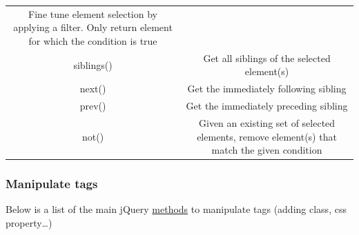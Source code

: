 \documentclass[]{book}
\begin{document}
\begin{longtable}[]{@{}cc@{}}
\begin{minipage}[t]{0.52\columnwidth}
Fine tune element selection by applying a filter. Only return element for which the condition is true\strut
\end{minipage}\tabularnewline
\begin{minipage}[t]{0.42\columnwidth}\centering
siblings()\strut
\end{minipage} & \begin{minipage}[t]{0.52\columnwidth}\centering
Get all siblings of the selected element(s)\strut
\end{minipage}\tabularnewline
\begin{minipage}[t]{0.42\columnwidth}\centering
next()\strut
\end{minipage} & \begin{minipage}[t]{0.52\columnwidth}\centering
Get the immediately following sibling\strut
\end{minipage}\tabularnewline
\begin{minipage}[t]{0.42\columnwidth}\centering
prev()\strut
\end{minipage} & \begin{minipage}[t]{0.52\columnwidth}\centering
Get the immediately preceding sibling\strut
\end{minipage}\tabularnewline
\begin{minipage}[t]{0.42\columnwidth}\centering
not()\strut
\end{minipage} & \begin{minipage}[t]{0.52\columnwidth}\centering
Given an existing set of selected elements, remove element(s) that match the given condition\strut
\end{minipage}\tabularnewline
\bottomrule
\end{longtable}

\hypertarget{manipulate-tags}{%
\subsubsection{Manipulate tags}\label{manipulate-tags}}

Below is a list of the main jQuery \href{https://api.jquery.com/category/manipulation/}{methods} to manipulate tags (adding class, css property\ldots{})
\end{document}
